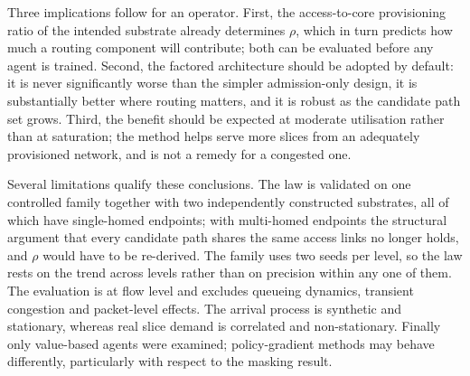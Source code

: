 \documentclass[10pt,journal,comsoc]{IEEEtran}
\begin{document}
Three implications follow for an operator. First, the access-to-core
provisioning ratio of the intended substrate already determines $\rho$,
which in turn predicts how much a routing component will contribute; both
can be evaluated before any agent is trained. Second, the factored
architecture should be adopted by default: it is never significantly worse
than the simpler admission-only design, it is substantially better where
routing matters, and it is robust as the candidate path set grows. Third,
the benefit should be expected at moderate utilisation rather than at
saturation; the method helps serve more slices from an adequately
provisioned network, and is not a remedy for a congested one.

Several limitations qualify these conclusions. The law is validated on one
controlled family together with two independently constructed substrates,
all of which have single-homed endpoints; with multi-homed endpoints the
structural argument that every candidate path shares the same access links
no longer holds, and $\rho$ would have to be re-derived. The family uses
two seeds per level, so the law rests on the trend across levels rather
than on precision within any one of them. The evaluation is at flow level
and excludes queueing dynamics, transient congestion and packet-level
effects. The arrival process is synthetic and stationary, whereas real
slice demand is correlated and non-stationary. Finally only value-based
agents were examined; policy-gradient methods may behave differently,
particularly with respect to the masking result.
\end{document}
